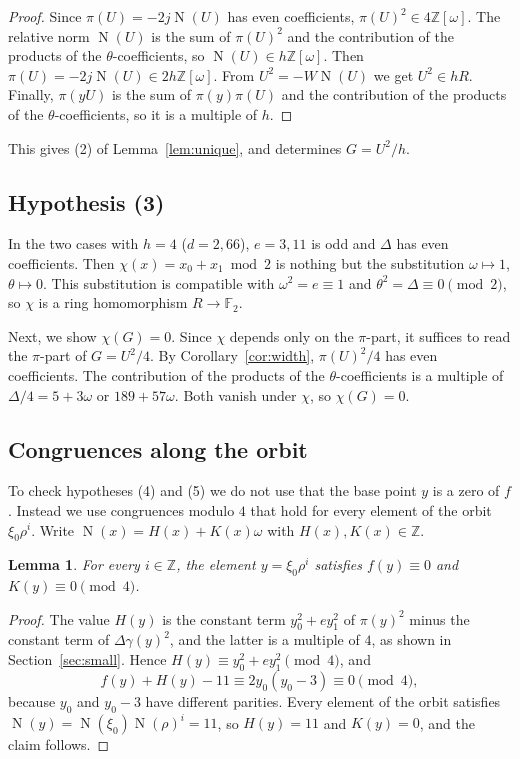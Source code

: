 \documentclass[a4paper,11pt]{article}
\theoremstyle{plain}
\newtheorem{lemma}[theorem]{Lemma}
\theoremstyle{definition}
\theoremstyle{remark}
\numberwithin{equation}{section}
\numberwithin{table}{section}
\newcommand{\Z}{\mathbb{Z}}
\newcommand{\F}{\mathbb{F}}
\newcommand{\Nm}{\operatorname{N}}
\begin{document}
\begin{proof}
Since $\pi(U)=-2j\Nm(U)$ has even coefficients, $\pi(U)^2\in4\Z[\omega]$.
The relative norm $\Nm(U)$ is the sum of $\pi(U)^2$ and the contribution of the products of the $\theta$-coefficients, so $\Nm(U)\in h\Z[\omega]$. Then $\pi(U)=-2j\Nm(U)\in2h\Z[\omega]$.
From $U^2=-W\Nm(U)$ we get $U^2\in hR$.
Finally, $\pi(yU)$ is the sum of $\pi(y)\pi(U)$ and the contribution of the products of the $\theta$-coefficients, so it is a multiple of $h$.
\end{proof}

This gives (2) of Lemma~\ref{lem:unique}, and determines $G=U^2/h$.

\subsection{Hypothesis (3)}\label{sec:hyp3}

In the two cases with $h=4$ ($d=2,66$), $e=3,11$ is odd and $\Delta$ has even coefficients.
Then $\chi(x)=x_0+x_1\bmod2$ is nothing but the substitution $\omega\mapsto1$, $\theta\mapsto0$.
This substitution is compatible with $\omega^2=e\equiv1$ and $\theta^2=\Delta\equiv0\pmod2$, so $\chi$ is a ring homomorphism $R\to\F_2$.

Next, we show $\chi(G)=0$. Since $\chi$ depends only on the $\pi$-part, it suffices to read the $\pi$-part of $G=U^2/4$.
By Corollary~\ref{cor:width}, $\pi(U)^2/4$ has even coefficients.
The contribution of the products of the $\theta$-coefficients is a multiple of $\Delta/4=5+3\omega$ or $189+57\omega$.
Both vanish under $\chi$, so $\chi(G)=0$.

\subsection{Congruences along the orbit}

To check hypotheses (4) and (5) we do not use that the base point $y$ is a zero of $f$.
Instead we use congruences modulo $4$ that hold for every element of the orbit $\xi_0\rho^i$.
Write $\Nm(x)=H(x)+K(x)\omega$ with $H(x),K(x)\in\Z$.

\begin{lemma}\label{lem:orbit4}
For every $i\in\Z$, the element $y=\xi_0\rho^i$ satisfies $f(y)\equiv0$ and $K(y)\equiv0\pmod4$.
\end{lemma}

\begin{proof}
The value $H(y)$ is the constant term $y_0^2+ey_1^2$ of $\pi(y)^2$ minus the constant term of $\Delta\gamma(y)^2$, and the latter is a multiple of $4$, as shown in Section~\ref{sec:small}.
Hence $H(y)\equiv y_0^2+ey_1^2\pmod4$, and
\[
f(y)+H(y)-11\equiv2y_0(y_0-3)\equiv0\pmod4,
\]
because $y_0$ and $y_0-3$ have different parities.
Every element of the orbit satisfies $\Nm(y)=\Nm(\xi_0)\Nm(\rho)^i=11$, so $H(y)=11$ and $K(y)=0$, and the claim follows.
\end{proof}
\end{document}
